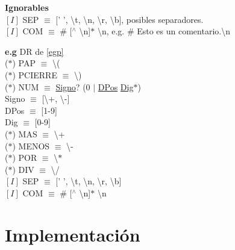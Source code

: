 \documentclass[\main/ApuntesPL.tex]{subfiles}
\begin{document}
      \newpage
      \par
      \textbf{\large Ignorables} \\
      \hspace{3mm}$[I]$ SEP $\equiv$ $[$' ', \textbackslash t, \textbackslash n, \textbackslash r, \textbackslash b], posibles separadores. \\
      \hspace{3mm}$[I]$ COM $\equiv$ \# [$^\wedge$ \textbackslash n]$\ast$ \textbackslash n, e.g. \# Esto es un comentario.\textbackslash n

      \bigskip
      \par
      \textbf{e.g}  DR de \cref{egp}\\
      \hspace{5mm}($\ast$) PAP $\equiv$ \textbackslash( \\
      \hspace{5mm}($\ast$) PCIERRE $\equiv$ \textbackslash) \\
      \hspace{5mm}($\ast$) NUM $\equiv$ \underline{Signo}? (0 $\mid$ \underline{DPos} \underline{Dig}$\ast$) \\
      \hspace{10mm} Signo $\equiv$ [\textbackslash+, \textbackslash-] \\
      \hspace{10mm} DPos  $\equiv$ [1-9] \\
      \hspace{10mm} Dig   $\equiv$ [0-9] \\
      \hspace{5mm}($\ast$) MAS $\equiv$ \textbackslash + \\
      \hspace{5mm}($\ast$) MENOS $\equiv$ \textbackslash - \\
      \hspace{5mm}($\ast$) POR $\equiv$ \textbackslash $\ast$ \\
      \hspace{5mm}($\ast$) DIV $\equiv$ \textbackslash / \\
      \hspace{5mm}$[I]$ SEP $\equiv$ $[$' ', \textbackslash t, \textbackslash n, \textbackslash r, \textbackslash b]\\
      \hspace{5mm}$[I]$ COM $\equiv$ \# [$^\wedge$ \textbackslash n]$\ast$ \textbackslash n

  \section{Implementación}
\end{document}
